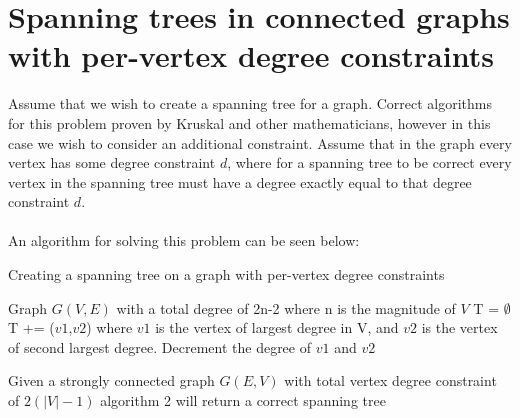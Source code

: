 \documentclass{article}
\begin{document}
	\section{Spanning trees in connected graphs with per-vertex degree constraints}
	Assume that we wish to create a spanning tree for a graph. Correct algorithms for this problem proven by Kruskal and other
	mathematicians, however in this case we wish to consider an additional constraint. Assume that in the graph every vertex has some degree constraint $d$,
	where for a spanning tree to be correct every vertex in the spanning tree must have a degree exactly equal to that degree constraint $d$. 
	\\\\
	An algorithm for solving this problem can be seen below:
	\\
		\begin{algorithm}[H]
		\caption{Creating a spanning tree on a graph with per-vertex degree constraints}
		\begin{algorithmic}[1]
			\State Graph $G(V,E)$ with a total degree of 2n-2 where n is the magnitude of $V$
			\State T = $\emptyset$
			\State T += ($v1$,$v2$) where $v1$ is the vertex of largest degree in V, and $v2$ is the vertex of second largest degree. Decrement the degree of $v1$ and $v2$
			\EndWhile
		\end{algorithmic}
	\newpage
	\end{algorithm}

	\begin{theorem}
		Given a strongly connected graph $G(E,V)$ with total vertex degree constraint of $2(|V|-1)$ algorithm 2 will return a correct spanning tree
	\end{theorem}
\end{document}
